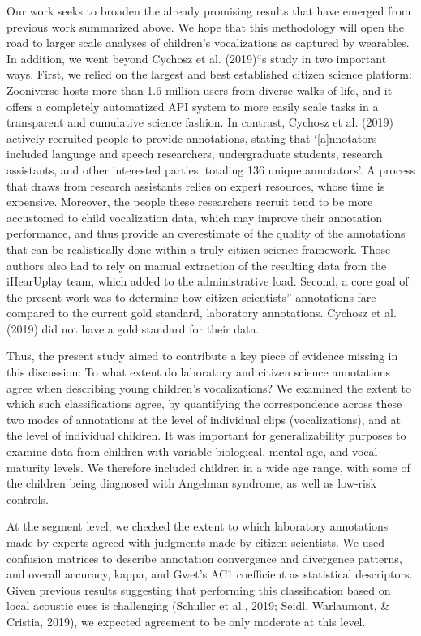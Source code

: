\documentclass[english,,man,floatsintext]{apa6}
\begin{document}
Our work seeks to broaden the already promising results that have emerged from previous work summarized above. We hope that this methodology will open the road to larger scale analyses of children's vocalizations as captured by wearables. In addition, we went beyond Cychosz et al. (2019)\enquote{s study in two important ways. First, we relied on the largest and best established citizen science platform: Zooniverse hosts more than 1.6 million users from diverse walks of life, and it offers a completely automatized API system to more easily scale tasks in a transparent and cumulative science fashion. In contrast, Cychosz et al. (2019) actively recruited people to provide annotations, stating that \enquote{{[}a{]}nnotators included language and speech researchers, undergraduate students, research assistants, and other interested parties, totaling 136 unique annotators}. A process that draws from research assistants relies on expert resources, whose time is expensive. Moreover, the people these researchers recruit tend to be more accustomed to child vocalization data, which may improve their annotation performance, and thus provide an overestimate of the quality of the annotations that can be realistically done within a truly citizen science framework. Those authors also had to rely on manual extraction of the resulting data from the iHearUplay team, which added to the administrative load. Second, a core goal of the present work was to determine how citizen scientists} annotations fare compared to the current gold standard, laboratory annotations. Cychosz et al. (2019) did not have a gold standard for their data.

Thus, the present study aimed to contribute a key piece of evidence missing in this discussion: To what extent do laboratory and citizen science annotations agree when describing young children's vocalizations? We examined the extent to which such classifications agree, by quantifying the correspondence across these two modes of annotations at the level of individual clips (vocalizations), and at the level of individual children. It was important for generalizability purposes to examine data from children with variable biological, mental age, and vocal maturity levels. We therefore included children in a wide age range, with some of the children being diagnosed with Angelman syndrome, as well as low-risk controls.

At the segment level, we checked the extent to which laboratory annotations made by experts agreed with judgments made by citizen scientists. We used confusion matrices to describe annotation convergence and divergence patterns, and overall accuracy, kappa, and Gwet's AC1 coefficient as statistical descriptors. Given previous results suggesting that performing this classification based on local acoustic cues is challenging (Schuller et al., 2019; Seidl, Warlaumont, \& Cristia, 2019), we expected agreement to be only moderate at this level.
\end{document}

